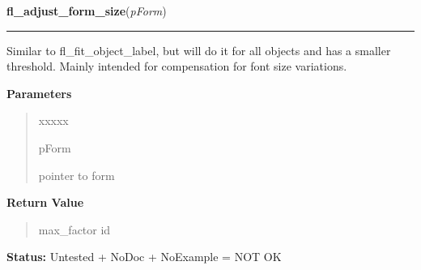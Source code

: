 \hspace{.8\funcindent}\begin{boxedminipage}{\funcwidth}

    \raggedright \textbf{fl\_adjust\_form\_size}(\textit{pForm})

    \vspace{-1.5ex}

    \rule{\textwidth}{0.5\fboxrule}
\setlength{\parskip}{2ex}
    Similar to fl\_fit\_object\_label, but will do it for all objects and 
    has a smaller threshold. Mainly intended for compensation for font size
    variations.

\setlength{\parskip}{1ex}
      \textbf{Parameters}
      \vspace{-1ex}

      \begin{quote}
        \begin{Ventry}{xxxxx}

          \item[pForm]

          pointer to form

        \end{Ventry}

      \end{quote}

      \textbf{Return Value}
    \vspace{-1ex}

      \begin{quote}
      max\_factor id

      \end{quote}

\textbf{Status:} Untested + NoDoc + NoExample = NOT OK



    \end{boxedminipage}

    \label{xformslib:library:fl_form_is_visible}

    \vspace{0.5ex}

